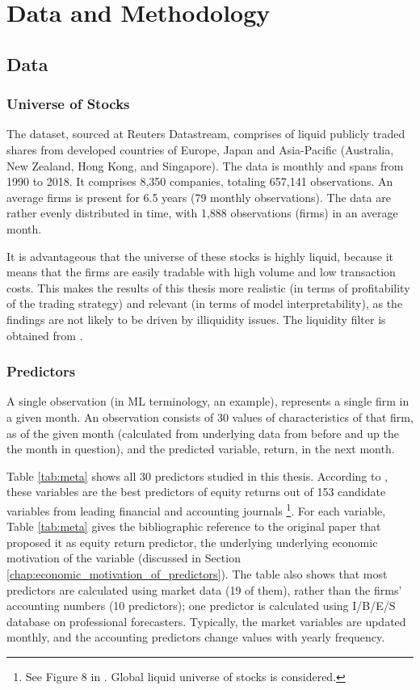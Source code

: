 \chapter{Data and Methodology}
\label{chap:met}

\section{Data}

	\subsection{Universe of Stocks}
		The dataset, sourced at Reuters Datastream, comprises of liquid publicly traded shares from developed countries of Europe, Japan and Asia-Pacific (Australia, New Zealand, Hong Kong, and Singapore). The data is monthly and spans from 1990 to 2018. It comprises 8,350 companies, totaling 657,141 observations. An average firms is present for 6.5 years (79 monthly observations). The data are rather evenly distributed in time, with 1,888 observations (firms) in an average month. 
		
		It is advantageous that the universe of these stocks is highly liquid, because it means that the firms are easily tradable with high volume and low transaction costs. This makes the results of this thesis more realistic (in terms of profitability of the trading strategy) and relevant (in terms of model interpretability), as the findings are not likely to be driven by illiquidity issues. The liquidity filter is obtained from \cite{tobek2020does}.  
	
	\subsection{Predictors}
	
		A single observation (in ML terminology, an example), represents a single firm in a given month. An observation consists of 30 values of characteristics of that firm, as of the given month (calculated from underlying data from before and up the the month in question), and the predicted variable, return, in the next month. 
		
		Table \ref{tab:meta} shows all 30 predictors studied in this thesis. According to \cite{tobek2020does}, these variables are the best predictors of equity returns out of 153  candidate variables from leading financial and accounting journals \footnote{See Figure 8 in \cite{tobek2020does}. Global liquid universe of stocks is considered.}. For each variable, Table \ref{tab:meta} gives the bibliographic reference to the original paper that proposed it as equity return predictor, the underlying underlying economic motivation of the variable (discussed in Section \ref{chap:economic_motivation_of_predictors}). The table also shows that most predictors are calculated using market data (19 of them), rather than the firms' accounting numbers (10 predictors); one predictor is calculated using I/B/E/S database on professional forecasters. Typically, the market variables are updated monthly, and the accounting predictors change values with yearly frequency.
		
